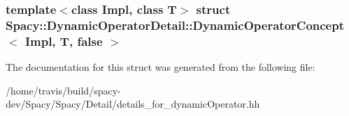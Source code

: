 \subsubsection*{template$<$class Impl, class T$>$ struct Spacy\-::\-Dynamic\-Operator\-Detail\-::\-Dynamic\-Operator\-Concept$<$ Impl, T, false $>$}



\-The documentation for this struct was generated from the following file\-:\begin{DoxyCompactItemize}
\item 
/home/travis/build/spacy-\/dev/\-Spacy/\-Spacy/\-Detail/details\-\_\-for\-\_\-dynamic\-Operator.\-hh\end{DoxyCompactItemize}
